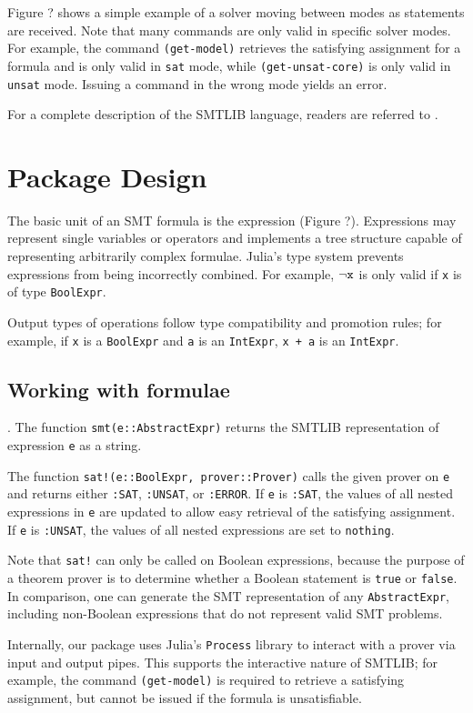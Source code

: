 \documentclass[conference]{IEEEtran}
\begin{document}
Figure ?%
shows a simple example of a solver moving between modes as statements are received. Note that many commands are only valid in specific solver modes.
For example, the command \verb|(get-model)| retrieves the satisfying assignment for a formula and is only valid in \verb|sat| mode, while \verb|(get-unsat-core)| is only valid in \verb|unsat| mode. Issuing a command in the wrong mode yields an error.

For a complete description of the SMTLIB language, readers are referred to \cite{smtlib2}.


\section{Package Design}
The basic unit of an SMT formula is the expression (Figure ?). %
Expressions may represent single variables or operators and implements a tree structure capable of representing arbitrarily complex formulae. Julia's type system prevents expressions from being incorrectly combined. For example, $\neg\verb|x|$ is only valid if \verb|x| is of type \verb|BoolExpr|.

Output types of operations follow type compatibility and promotion rules; for example, if \verb|x| is a \verb|BoolExpr| and \verb|a| is an \verb|IntExpr|, \verb|x + a| is an \verb|IntExpr|.

\subsection{Working with formulae}.
The function \verb|smt(e::AbstractExpr)| returns the SMTLIB representation of expression \verb|e| as a string.

The function \verb|sat!(e::BoolExpr, prover::Prover)| calls the given prover on \verb|e| and returns either \verb|:SAT|, \verb|:UNSAT|, or \verb|:ERROR|. If \verb|e| is \verb|:SAT|, the values of all nested expressions in \verb|e| are updated to allow easy retrieval of the satisfying assignment. If \verb|e| is \verb|:UNSAT|, the values of all nested expressions are set to \verb|nothing|.

Note that \verb|sat!| can only be called on Boolean expressions, because the purpose of a theorem prover is to determine whether a Boolean statement is \verb|true| or \verb|false|. In comparison, one can generate the SMT representation of any \verb|AbstractExpr|, including non-Boolean expressions that do not represent valid SMT problems.

Internally, our package uses Julia's \verb|Process| library to interact with a prover via input and output pipes. This supports the interactive nature of SMTLIB; for example, the command \verb|(get-model)| is required to retrieve a satisfying assignment, but cannot be issued if the formula is unsatisfiable.
\end{document}
